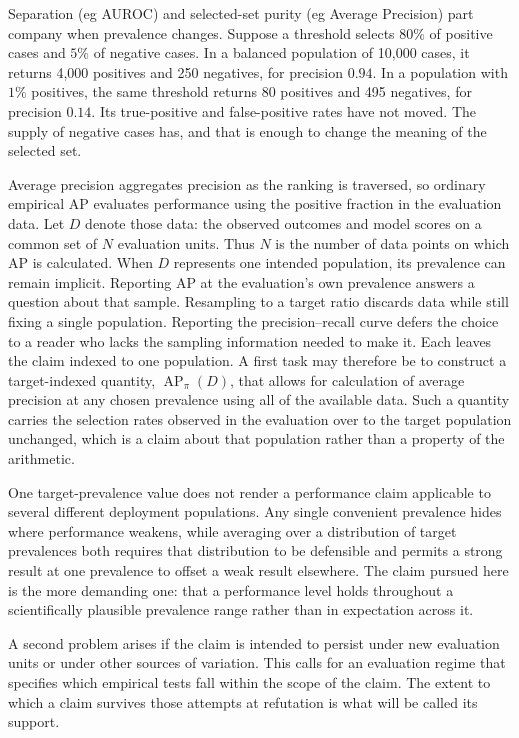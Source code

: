 \documentclass[11pt]{article}
\newcommand{\AP}{\operatorname{AP}}
\theoremstyle{remark}
\begin{document}
Separation (eg AUROC) and selected-set purity (eg Average Precision) part company when prevalence changes.
Suppose a threshold selects $80\%$ of positive cases and $5\%$ of negative
cases. In a balanced population of 10,000 cases, it returns 4,000 positives and
250 negatives, for precision $0.94$. In a population with $1\%$ positives, the
same threshold returns 80 positives and 495 negatives, for precision $0.14$.
Its true-positive and false-positive rates have not moved. The supply of
negative cases has, and that is enough to change the meaning of the selected
set.

Average precision aggregates precision as the ranking is traversed, so ordinary
empirical AP evaluates performance using the positive fraction in the
evaluation data. Let $D$ denote those data: the observed outcomes and model
scores on a common set of $N$ evaluation units. Thus $N$ is the number of data
points on which AP is calculated. When $D$ represents one intended
population, its prevalence can remain implicit. Reporting AP at the
evaluation's own prevalence answers a question about that sample. Resampling to
a target ratio discards data while still fixing a single population. Reporting
the precision--recall curve defers the choice to a reader who lacks the
sampling information needed to make it. Each leaves the claim indexed to one
population. A first task may therefore be to construct a target-indexed
quantity, $\AP_\pi(D)$, that allows for calculation of average precision at any
chosen prevalence using all of the available data. Such a quantity carries the
selection rates observed in the evaluation over to the target population
unchanged, which is a claim about that population rather than a property of the
arithmetic.

One target-prevalence value does not render a performance claim applicable to
several different deployment populations. Any single convenient prevalence
hides where performance weakens, while averaging over a distribution of target
prevalences both requires that distribution to be defensible and permits a
strong result at one prevalence to offset a weak result elsewhere. The claim
pursued here is the more demanding one: that a performance level holds
throughout a scientifically plausible prevalence range rather than in
expectation across it.

A second problem arises if the claim is intended to persist under new
evaluation units or under other sources of variation. This calls for an
evaluation regime that specifies which empirical tests fall within the scope
of the claim. The extent to which a claim survives those attempts at
refutation is what will be called its support.
\end{document}
